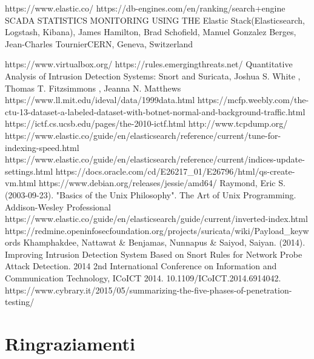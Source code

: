 \documentclass[12pt,a4paper,openright,twoside]{report}
\begin{document}
\begin{thebibliography}{90}
 https://www.elastic.co/
 https://db-engines.com/en/ranking/search+engine
 SCADA STATISTICS MONITORING USING THE Elastic Stack(Elasticsearch, Logstash, Kibana), James Hamilton, Brad Schofield, Manuel Gonzalez Berges, Jean-Charles TournierCERN, Geneva, Switzerland

 https://www.virtualbox.org/
 https://rules.emergingthreats.net/
 Quantitative Analysis of Intrusion Detection Systems: Snort and Suricata, Joshua S. White , Thomas T. Fitzsimmons , Jeanna N. Matthews
 https://www.ll.mit.edu/ideval/data/1999data.html
 https://mcfp.weebly.com/the-ctu-13-dataset-a-labeled-dataset-with-botnet-normal-and-background-traffic.html
 https://ictf.cs.ucsb.edu/pages/the-2010-ictf.html
 http://www.tcpdump.org/
 https://www.elastic.co/guide/en/elasticsearch/reference/current/tune-for-indexing-speed.html
 https://www.elastic.co/guide/en/elasticsearch/reference/current/indices-update-settings.html
 https://docs.oracle.com/cd/E26217\_01/E26796/html/qs-create-vm.html
 https://www.debian.org/releases/jessie/amd64/
 Raymond, Eric S. (2003-09-23). "Basics of the Unix Philosophy". The Art of Unix Programming. Addison-Wesley Professional
 https://www.elastic.co/guide/en/elasticsearch/guide/current/inverted-index.html
 https://redmine.openinfosecfoundation.org/projects/suricata/wiki/Payload\_keywords
 Khamphakdee, Nattawat & Benjamas, Nunnapus & Saiyod, Saiyan. (2014). Improving Intrusion Detection System Based on Snort Rules for Network Probe Attack Detection. 2014 2nd International Conference on Information and Communication Technology, ICoICT 2014. 10.1109/ICoICT.2014.6914042.
 https://www.cybrary.it/2015/05/summarizing-the-five-phases-of-penetration-testing/
\end{thebibliography}
\clearpage{\pagestyle{empty}\cleardoublepage}
\chapter*{Ringraziamenti}
\thispagestyle{empty}
\end{document}
